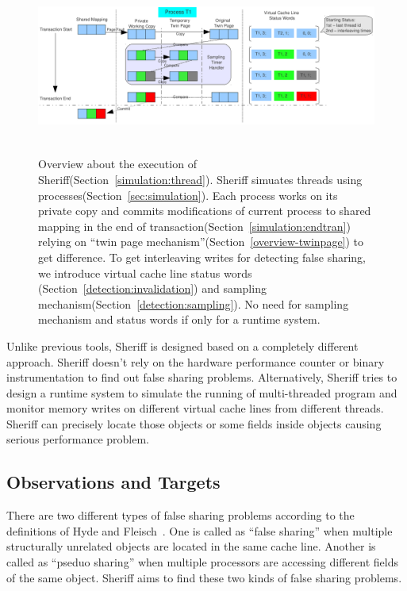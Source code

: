 \label{sec:overview}

\begin{figure}[!t]
\centering
\includegraphics[height=2.3in]{sheriff/figure/overview.pdf}
\caption{
Overview about the execution of Sheriff(Section~\ref{simulation:thread}). 
Sheriff simuates threads using processes(Section~\ref{sec:simulation}). 
Each process works on its private copy  
and commits modifications of current process to shared mapping in the end of transaction(Section~\ref{simulation:endtran})
relying on ``twin page mechanism''(Section~\ref{overview-twinpage}) to get difference. 
To get interleaving writes for detecting false sharing, 
we introduce virtual cache line status words (Section~\ref{detection:invalidation}) 
and sampling mechanism(Section~\ref{detection:sampling}). 
No need for sampling mechanism and status words if only for a runtime system.
\label{fig:overview}}
\end{figure}

Unlike previous tools, Sheriff is designed based on a completely different approach.
Sheriff doesn't rely on the hardware performance counter or binary instrumentation to find out false sharing problems. 
Alternatively, Sheriff tries to design a runtime system to simulate the running of multi-threaded program and 
monitor memory writes on different virtual cache lines from different threads.
Sheriff can precisely locate those objects or some fields inside objects causing serious performance problem. 

\subsection{Observations and Targets}
\label{overview:target}
There are two different types of false sharing problems according to 
the definitions of Hyde and Fleisch~\cite{falseshare:Analysis}. 
One is called as ``false sharing'' when multiple structurally unrelated objects 
are located in the same cache line. 
Another is called as ``pseduo sharing'' when multiple processors 
are accessing different fields of the same object.
Sheriff aims to find these two kinds of false sharing problems. 

